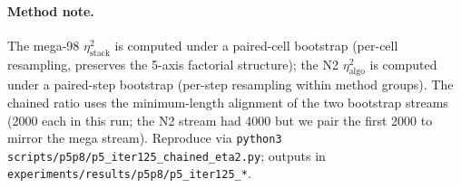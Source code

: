 \paragraph{Method note.} The mega-98 $\eta^2_{\mathrm{stack}}$ is
computed under a paired-cell bootstrap (per-cell resampling,
preserves the 5-axis factorial structure); the N2
$\eta^2_{\mathrm{algo}}$ is computed under a paired-step bootstrap
(per-step resampling within method groups). The chained ratio uses
the minimum-length alignment of the two bootstrap streams (2000 each
in this run; the N2 stream had 4000 but we pair the first 2000 to
mirror the mega stream). Reproduce via
\texttt{python3 scripts/p5p8/p5\_iter125\_chained\_eta2.py}; outputs
in \texttt{experiments/results/p5p8/p5\_iter125\_*}.

